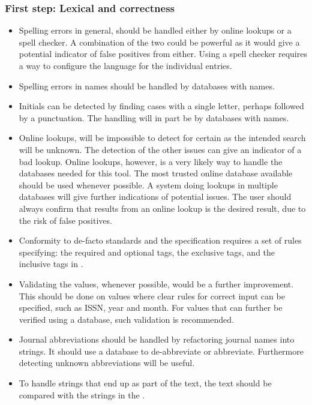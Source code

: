 \subsubsection{First step: Lexical and correctness}
\begin{itemize}
\item Spelling errors in general, should be handled either by online
  lookups or a spell checker.  A combination of the two could be
  powerful as it would give a potential indicator of false positives
  from either.  Using a spell checker requires a way to configure the
  language for the individual entries.

\item Spelling errors in names should be handled by databases with
  names.

\item Initials can be detected by finding cases with a single letter,
  perhaps followed by a punctuation. The handling will in part be by
  databases with names.

\item Online lookups, will be impossible to detect for certain as the
  intended search will be unknown.  The detection of the other issues
  can give an indicator of a bad lookup.  Online lookups, however, is
  a very likely way to handle the databases needed for this tool.  The
  most trusted online database available should be used whenever
  possible.  A system doing lookups in multiple databases will give
  further indications of potential issues.  The user should always
  confirm that results from an online lookup is the desired result,
  due to the risk of false positives.

\item Conformity to de-facto standards and the {\bibtex} specification
  requires a set of rules specifying: the required and optional tags,
  the exclusive tags, and the inclusive tags in {\bibtex}.

\item Validating the values, whenever possible, would be a further
  improvement.  This should be done on values where clear rules for
  correct input can be specified, such as ISSN, year and month.  For
  values that can further be verified using a database, such
  validation is recommended.

\item Journal abbreviations should be handled by refactoring journal
  names into strings.  It should use a database to de-abbreviate or
  abbreviate.  Furthermore detecting unknown abbreviations will be
  useful.

\item To handle {\bibtex} strings that end up as part of the text, the
  text should be compared with the strings in the .
\end{itemize}


